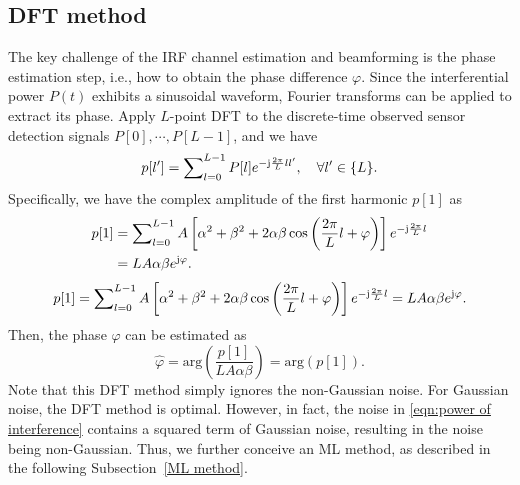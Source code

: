 \documentclass[journal,twocolumn]{IEEEtran}
\theoremstyle{nonumberplain}
\def \arg {\text{arg}}
\begin{document}
\subsection{DFT method}  \label{DFT method}
    The key challenge of the IRF channel estimation and beamforming is the phase estimation step, i.e., how to obtain the phase difference $\varphi$. Since the interferential power $P(t)$ exhibits a sinusoidal waveform, Fourier transforms can be applied to extract its phase. Apply $L$-point \ac{DFT} to the discrete-time  observed sensor detection signals $P[0],\cdots ,P[L-1]$, and we have
    \begin{equation}
        \label{DFT}
        p[l']=\sum\nolimits_{l=0}^{L-1}P[l]e^{-{\rm j}\frac{2\pi}{L}ll'},\quad \forall l'\in \{L\}.
    \end{equation}
    Specifically, we have the complex amplitude of the first harmonic $p[1]$ as 
    \ifx\onecol\undefined
        \begin{equation} \label{DFT l=1}
            \begin{aligned}
                p[1]&=\sum\nolimits_{l=0}^{L-1}A\left[\alpha^{2}+\beta^{2}+2\alpha\beta\cos\left(\frac{2\pi}{L}l+\varphi\right)\right]e^{-{\rm j}\frac{2\pi}{L}l}\\
                &=LA\alpha\beta  e^{{\rm j}\varphi}.
            \end{aligned}
        \end{equation}
    \else 
        \begin{equation}
            \label{DFT l=1}
            p[1]=\sum\nolimits_{l=0}^{L-1}A\left[\alpha^{2}+\beta^{2}+2\alpha\beta\cos\left(\frac{2\pi}{L}l+\varphi\right)\right]e^{-{\rm j}\frac{2\pi}{L}l}=LA\alpha\beta  e^{{\rm j}\varphi}.
        \end{equation}
    \fi
    Then, the phase $\varphi$ can be estimated as
    \begin{equation}
        \label{LS estimate result}
        \hat{\varphi}=\arg\left(\frac{p[1]}{LA\alpha\beta}\right) = \arg\left(p[1]\right).
    \end{equation}
    Note that this DFT method simply ignores the non-Gaussian noise. For Gaussian noise, the DFT method is optimal. However, in fact, the noise in \eqref{eqn:power of interference} contains a squared term of Gaussian noise, resulting in the noise being non-Gaussian. Thus, we further conceive an ML method, as described in the following Subsection~\ref{ML method}. 
\end{document}
